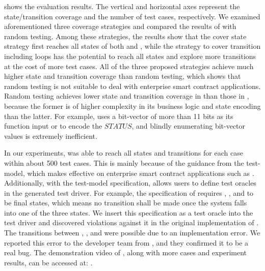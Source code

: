 %

 shows the evaluation results.
The vertical and horizontal axes represent the state/transition coverage and the number of test
cases, respectively.
We examined aforementioned three coverage strategies and compared the results of \modcon with random
testing.
Among these strategies, the results show that the cover state strategy first reaches all states
of both \wecredit and , while the strategy to cover transition including loops
has the potential to reach all states and explore more transitions at the cost of more test cases.
All of the three proposed strategies achieve much higher state and transition coverage than random
testing, which shows that random testing is not suitable to deal with enterprise smart contract applications.
Random testing achieves lower state and transition coverage in \wecredit than those in
, because the former is of higher complexity in its business logic and state encoding than the latter.
For example, \wecredit uses a bit-vector of more than 11 bits as its function input or to encode the
$\mathit{STATUS}$, and blindly enumerating bit-vector values is extremely inefficient.

In our experiments, \modcon was able to reach all states and transitions for each case within about
500 test cases.
This is mainly because of the guidance from the test-model, which makes \modcon effective on
enterprise smart contract applications such as \wecredit.
Additionally, with the test-model specification, \modcon allows users to define test oracles in the
generated test driver.
For example, the specification of \wecredit requires , , and
 to be final states, which means no transition shall be made once the system falls
into one of the three states.
We insert this specification as a test oracle into the test driver and discovered violations
against it in the original implementation of \wecredit.
The transitions between , , and  were possible due to an
implementation error.
We reported this error to the \wecredit developer team from \company, and they confirmed it to be a
real bug.
The demonstration video of \modcon, along with more cases and experiment results, can be accessed at: \modconurl.

